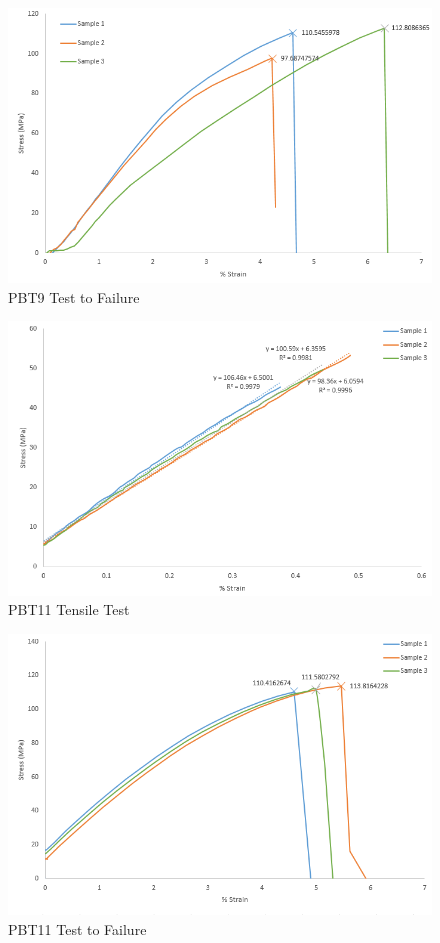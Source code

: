 \documentclass[11pt]{article}
\begin{document}
\begin{figure}[H]
\centering
\includegraphics[width=.95\linewidth]{figures/PBT9_Fail.png}
\caption{PBT9 Test to Failure}
\label{pbt9fail}
\end{figure}

\begin{figure}[H]
\centering
\includegraphics[width=.95\linewidth]{figures/PBT11_Tensile.png}
\caption{PBT11 Tensile Test}
\label{pbt11tensile}
\end{figure}

\begin{figure}[H]
\centering
\includegraphics[width=.95\linewidth]{figures/PBT11_Fail.png}
\caption{PBT11 Test to Failure}
\label{pbt11fail}
\end{figure}
\end{document}
